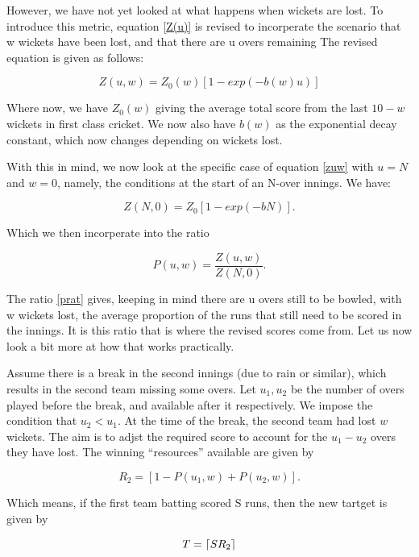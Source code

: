 However, we have not yet looked at what happens when wickets are lost. To introduce this metric, equation \ref{Z(u)}
is revised to incorperate the scenario that w wickets have been lost, and that there are u overs remaining
The revised equation is given as follows:

\begin{equation}
    Z(u,w) = Z_0(w)[1-exp(-b(w)u)]
    \label{zuw}
\end{equation}

Where now, we have $Z_0(w)$ giving the average total score from the last $10-w$ wickets in first class cricket.
We now also have $b(w)$ as the exponential decay constant, which now changes depending on wickets lost.


With this in mind, we now look at the specific case of equation \ref{zuw} with $u=N$ and $w=0$, namely, the conditions
at the start of an N-over innings. We have:

\begin{equation}
    Z(N,0) = Z_0[1-exp(-bN)].
    \label{zstart}
\end{equation}

Which we then incorperate into the ratio

\begin{equation}
    P(u,w) = \frac{Z(u,w)}{Z(N,0)}.
    \label{prat}
\end{equation}

The ratio \ref{prat} gives, keeping in mind there are u overs still to be bowled, with w wickets
lost, the average proportion of the runs that still need to be scored in the innings. 
It is this ratio that is where the revised scores come from. Let us now look a bit more at how that works
practically.

\begin{example}
    \label{dlExMain}
    Assume there is a break in the second innings (due to rain or similar), which results in the second team missing some overs.
    Let $u_1, u_2$ be the number of overs played before the break, and available after it respectively. We impose the condition
    that $u_2 < u_1$. At the time of the break, the second team had lost $w$ wickets. The aim is to adjst the required score to account
    for the $u_1 - u_2$ overs they have lost. The winning ``resources'' available are given by

    \[
        R_2 = [1-P(u_1,w)+P(u_2,w)].
    \]  

    Which means, if the first team batting scored S runs, then the new tartget is given by

    \[
        T = \lceil SR_2\rceil
    \]  
\end{example}

